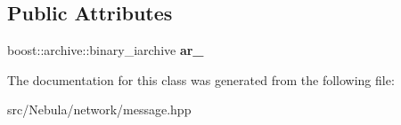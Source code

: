 \subsection*{\-Public \-Attributes}
\begin{DoxyCompactItemize}
\item 
\hypertarget{classgal_1_1network_1_1imessage_a024ced0e503c39e7ff210c6eff53c2fd}{boost\-::archive\-::binary\-\_\-iarchive {\bfseries ar\-\_\-}}\label{classgal_1_1network_1_1imessage_a024ced0e503c39e7ff210c6eff53c2fd}

\end{DoxyCompactItemize}


\-The documentation for this class was generated from the following file\-:\begin{DoxyCompactItemize}
\item 
src/\-Nebula/network/message.\-hpp\end{DoxyCompactItemize}
